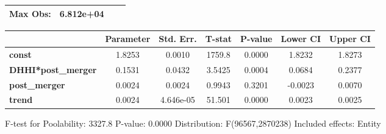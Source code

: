 \documentclass{report}
\begin{document}
\begin{center}
\begin{tabular}{lclc}
\textbf{Max Obs:}          &     6.812e+04      & \textbf{                     }   &                  \\
\bottomrule
\end{tabular}
\begin{tabular}{lcccccc}
                           & \textbf{Parameter} & \textbf{Std. Err.} & \textbf{T-stat} & \textbf{P-value} & \textbf{Lower CI} & \textbf{Upper CI}  \\
\midrule
\textbf{const}             &       1.8253       &       0.0010       &      1759.8     &      0.0000      &       1.8232      &       1.8273       \\
\textbf{DHHI*post\_merger} &       0.1531       &       0.0432       &      3.5425     &      0.0004      &       0.0684      &       0.2377       \\
\textbf{post\_merger}      &       0.0024       &       0.0024       &      0.9943     &      0.3201      &      -0.0023      &       0.0070       \\
\textbf{trend}             &       0.0024       &     4.646e-05      &      51.501     &      0.0000      &       0.0023      &       0.0025       \\
\bottomrule
\end{tabular}
\end{center}

F-test for Poolability: 3327.8 \newline
 P-value: 0.0000 \newline
 Distribution: F(96567,2870238) \newline
  \newline
 Included effects: Entity
\end{document}
